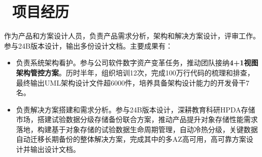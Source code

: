 \documentclass{resume}
\begin{document}



\section{\faBriefcase\ 项目经历}

作为产品和方案设计人员，负责产品需求分析，架构和解决方案设计，评审工作。参与24B版本设计，输出多份设计文档。主要成果有：
\begin{onehalfspacing}
  \begin{itemize}
    \item 负责系统架构看护。参与公司软件数字资产变革任务，推动团队接纳\textbf{4+1视图架构管控方案}。历时半年，组织培训12次，完成100万行代码的梳理和排查，最终输出UML架构设计文件超6000件，培养具备架构设计能力的开发骨干7名。
    \item 负责解决方案搭建和需求分析。参与24B版本设计，深耕教育科研HPDA存储市场，搭建试验数据分级存储备份联合方案，推动产品提升对象存储性能需求落地，构建基于对象存储的试验数据生命周期管理，自动冷热分级，关键数据自动迁移长期备份的整体解决方案，完成其中的多AZ高可用，高可靠方案设计并输出设计文档。
  \end{itemize}
\end{onehalfspacing}
\end{document}
